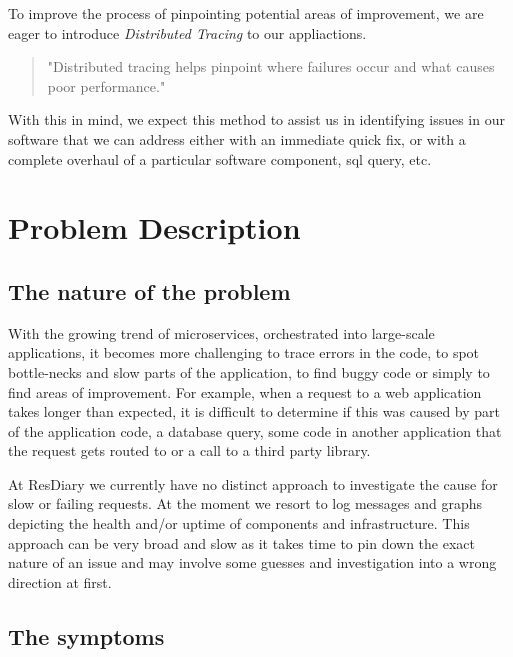 \documentclass[11pt]{article}
\begin{document}
To improve the process of pinpointing potential areas of improvement, we are eager to introduce \textit{Distributed Tracing} to our appliactions.
\begin{quote}
    "Distributed tracing helps pinpoint where failures occur and what causes poor performance." \cite{opentracing}
\end{quote}  
With this in mind, we expect this method to assist us in identifying issues in our software that we can address either with an immediate quick fix, or with a complete overhaul of a particular software component, sql query, etc.

\section{Problem Description}


\subsection{The nature of the problem}

With the growing trend of microservices, orchestrated into large-scale applications, it becomes more challenging to trace errors in the code, to spot bottle-necks and slow parts of the application, to find buggy code or simply to find areas of improvement. For example, when a request to a web application takes longer than expected, it is difficult to determine if this was caused by part of the application code, a database query, some code in another application that the request gets routed to or a call to a third party library.

At ResDiary we currently have no distinct approach to investigate the cause for slow or failing requests. At the moment we resort to log messages and graphs depicting the health and/or uptime of components and infrastructure. This approach can be very broad and slow as it takes time to pin down the exact nature of an issue and may involve some guesses and investigation into a wrong direction at first. 

\subsection{The symptoms}
\end{document}
